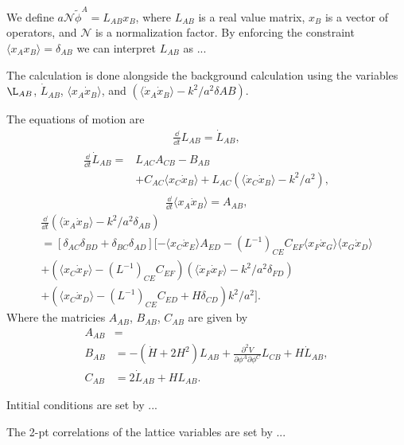 We define $a\mathcal{N}\tilde{\phi}^A = L_{AB}x_B$, where $L_{AB}$ is a real value matrix, $x_{B}$ is a vector of operators, and $\mathcal{N}$ is a normalization factor. By enforcing the constraint $\langle x_Ax_B \rangle = \delta_{AB}$ we can interpret $L_{AB}$ as ...

The calculation is done alongside the background calculation using the variables $\L_{AB}$, $\dot{L}_{AB}$, $\langle x_A\dot{x}_B \rangle$, and $(\langle \dot{x}_A\dot{x}_B \rangle - k^2/a^2\delta{AB})$.

The equations of motion are
\begin{align}
  \frac{\dd}{\dd t} L_{AB} = \dot{L}_{AB},
\end{align}
\begin{align}
  \begin{split}
  \frac{\dd}{\dd t} \dot{L}_{AB} = & L_{AC}A_{CB} - B_{AB} \\
    & + C_{AC}\langle x_C\dot{x}_B \rangle + L_{AC}(\langle \dot{x}_C\dot{x}_B \rangle - k^2/a^2),
  \end{split}
\end{align}
\begin{align}
  \frac{\dd}{\dd t} \langle x_A\dot{x}_B \rangle = A_{AB},
\end{align}
\begin{multline}
  \frac{\dd}{\dd t} (\langle \dot{x}_A\dot{x}_B \rangle - k^2/a^2\delta_{AB}) \\= 
       [\delta_{AC}\delta_{BD} + \delta_{BC}\delta_{AD}]
       [-\langle x_C\dot{x}_E \rangle A_{ED}
         - (L^{-1})_{CE}C_{EF}\langle x_F\dot{x}_G \rangle\langle x_G\dot{x}_D \rangle\\
         + (\langle x_C\dot{x}_F \rangle - (L^{-1})_{CE}C_{EF})(\langle \dot{x}_F\dot{x}_F \rangle - k^2/a^2\delta_{FD})\\
         + (\langle x_C\dot{x}_D \rangle - (L^{-1})_{CE}C_{ED} + H\delta_{CD})k^2/a^2].
\end{multline}
Where the matricies $A_{AB}$, $B_{AB}$, $C_{AB}$ are given by
\begin{align}
  A_{AB} & = \\
  B_{AB} &= -(\dot{H} + 2H^2)L_{AB} + \frac{\partial^2V}{\partial\phi^A\partial\phi^C}L_{CB} + H\dot{L}_{AB}, \\
  C_{AB} &= 2\dot{L}_{AB} + HL_{AB}.
\end{align}

Intitial conditions are set by ...

The 2-pt correlations of the lattice variables are set by ...
